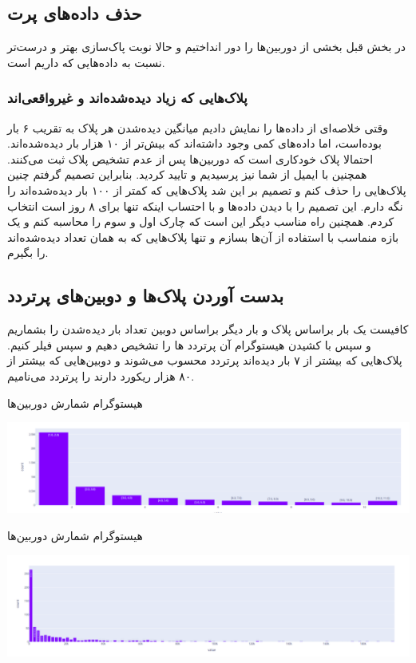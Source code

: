 \documentclass[12pt]{article}
\begin{document}
\subsection*{حذف داده‌های پرت}
در بخش قبل بخشی از دوربین‌ها را دور انداختیم و حالا نوبت پاک‌سازی بهتر و درست‌تر نسبت به داده‌هایی که داریم است.

\subsubsection{پلاک‌هایی که زیاد دیده‌شده‌اند و غیر‌واقعی‌اند}
وقتی خلاصه‌ای از داده‌ها را نمایش دادیم میانگین دیده‌شدن هر پلاک به تقریب ۶ بار بوده‌است، اما
داده‌های کمی وجود داشته‌اند که بیش‌تر از ۱۰ هزار بار دیده‌شده‌اند.
احتمالا پلاک خودکاری است که دوربین‌ها پس از عدم تشخیص پلاک ثبت می‌کنند. همچنین
با ایمیل از شما نیز پرسیدیم و تایید کردید. بنابراین تصمیم گرفتم
چنین پلاک‌هایی را حذف کنم و تصمیم بر این شد پلاک‌هایی که کمتر از ۱۰۰ بار دیده‌شده‌اند را نگه دارم. این تصمیم را با 
دیدن داده‌ها و با احتساب اینکه تنها برای ۸ روز است انتخاب کردم. همچنین راه مناسب دیگر این است که 
چارک اول و سوم را محاسبه کنم و یک بازه منماسب با استفاده از آن‌ها بسازم و تنها پلاک‌هایی که به همان تعداد دیده‌شده‌اند را بگیرم.

\subsection*{بدست آوردن پلاک‌ها و دوبین‌های پرتردد}
کافیست یک بار براساس پلاک و بار دیگر براساس دوبین تعداد بار دیده‌شدن را بشماریم و سپس
با کشیدن هیستوگرام آن پرتردد ها را تشخیص دهیم و سپس فیلر کنیم.
پلاک‌هایی که بیشتر از ۷ بار دیده‌اند پرتردد محسوب می‌شوند و دوبین‌هایی که 
بیشتر از ۸۰ هزار ریکورد دارند را پرتردد می‌نامیم.

هیستوگرام شمارش دوربین‌ها

\includegraphics[scale=0.28]{busyPlate.png}

هیستوگرام شمارش دوربین‌ها

\includegraphics[scale=0.28]{devicePlate.png}
\end{document}
